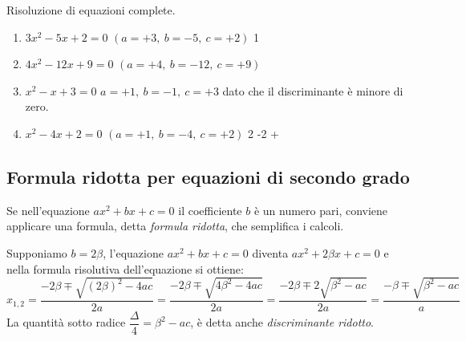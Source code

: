 \begin{esempio}{}{}
Risoluzione di equazioni complete.
\begin{enumerate}[left=0mm]
\item \(3x^2 -5x +2 = 0\) \quad \((a = +3,~b = -5,~c = +2)\) 
      {}{1}
\item \(4x^2 -12x +9 = 0\) \((a = +4,~b = -12,~c = +9)\)
            {}
\item \(x^2 -x +3=0\) \quad \(a = +1,~b = -1,~c = +3\)
            {}
dato che il discriminante è minore di zero.
\item \(x^2 -4x +2 = 0\) \quad \((a = +1,~b = -4,~c = +2)\) 
      {2 -}{2 +}
\end{enumerate}
\end{esempio}




\subsection{Formula ridotta per equazioni di secondo grado}

Se nell'equazione
\(a x^2 +b x +c=0\) il coefficiente \(b\) è un numero pari, conviene 
applicare una formula, detta \emph{formula ridotta}, che semplifica i 
calcoli.

Supponiamo \(b=2 \beta\), l'equazione \(a x^2 +b x +c=0\) diventa 
\(a x^2 +2 \beta x +c=0\) 
e nella formula risolutiva dell'equazione si ottiene:
{\small
\[x_{1,2}=\dfrac{-2 \beta \mp \sqrt{( 2 \beta )^2 -4ac}}{2a}=
\dfrac{-2 \beta \mp \sqrt{4\beta^{2} -4ac}}{2a}=
\dfrac{-2 \beta \mp 2 \sqrt{\beta^{2} -ac}}{2 a}=
\dfrac{-\beta \mp \sqrt{\beta^2 -ac}}{a}\]
} %
La quantità sotto radice 
\(\dfrac{\Delta}{4} = \beta^{2} -a c\), 
è detta anche \emph{discriminante ridotto}.

